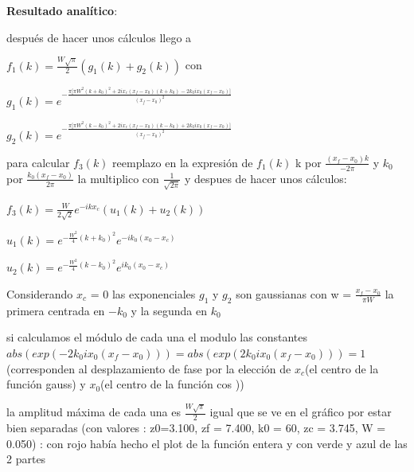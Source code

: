 \documentclass{article}
\begin{document}
\textbf{Resultado analítico}:
\begin{description}
\item después de hacer unos cálculos llego a 
\item $f_1(k) = \frac{W \sqrt{\pi}}{2} (g_1(k) + g_2(k)) $ con
\item $g_1(k) =  e^{-\frac{\pi \big[ \pi  W^2 (k + k_0)^2   + 2  i x_c(x_f - x_0)(k+ k_0)   - 2 k_0 i x_0 (x_f-x_0) \big]}{(x_f-x_0)^2}}$
\item $g_2(k) = e^{-\frac{\pi \big[\pi  W^2 (k - k_0)^2  +2 i x_c(x_f - x_0)(k - k_0)  + 2 k_0 i x_0 (x_f-x_0)\big]}{(x_f - x_0)^2}} $

\color{red}

\item para calcular $f_3(k)$ reemplazo en la expresión de $f_1(k)$ k por $\frac{(x_f - x_0)k}{-2 \pi}$ y $k_0$ por $\frac{k_0 (x_f - x_0)}{2 \pi} $
la multiplico con $ \frac{1}{\sqrt{2 \pi}}$ y despues de hacer unos cálculos:
\item $f_3(k) = \frac{W}{2 \sqrt{2}}  e^{-i  k  x_c}  (u_1(k) + u_2(k)) $
\item $u_1(k) = e^{-\frac{W^2}{4}  (k+k_0)^2} e^{-i  k_0 (x_0-x_c)} $ 
\item $u_2(k) = e^{-\frac{W^2}{4}  (k-k_0)^2} e^{i  k_0 (x_0-x_c)} $ 

\color{black}
\item Considerando $x_c$ = 0 las exponenciales $g_1$ y $g_2$ son  gaussianas  con w = $\frac{x_f - x_0}{\pi W}$ la primera centrada en $-k_0$ y la segunda en $k_0$
\item si calculamos el módulo de cada una  el modulo las constantes $ abs(exp( - 2 k_0 i x_0 (x_f-x_0))) = abs(exp( 2 k_0 i x_0 (x_f-x_0)))  = 1$
(corresponden al desplazamiento de fase por la elección de $x_c$(el centro de la función gauss) y $x_0$(el centro de la función cos ))
\item la amplitud  máxima de cada una es $\frac{W \sqrt{\pi}}{2}$ igual que se ve en el gráfico por estar bien separadas (con valores :  z0=3.100, zf = 7.400, k0 = 60, zc = 3.745, W = 0.050) : con rojo había hecho el plot de la función entera y con verde y azul de las 2 partes 


\end{description}
\end{document}
